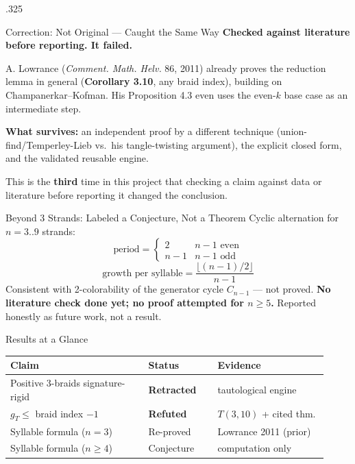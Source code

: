 \documentclass[final]{beamer}
\begin{document}
\begin{frame}[t]
\begin{columns}[t, totalwidth=\textwidth]
\begin{column}{.325\linewidth}
\begin{block}{Correction: Not Original --- Caught the Same Way}
\centering
{\color{sealcolor}\Large\textbf{Checked against literature before reporting. It failed.}}

\vspace{8pt}
\raggedright
A. Lowrance (\emph{Comment. Math. Helv.} 86, 2011) already proves the
reduction lemma in general (\textbf{Corollary 3.10}, any braid index),
building on Champanerkar--Kofman. His Proposition 4.3 even uses the
even-$k$ base case as an intermediate step.

\vspace{6pt}
\textbf{What survives:} an independent proof by a different technique
(union-find/Temperley-Lieb vs.\ his tangle-twisting argument), the
explicit closed form, and the validated reusable engine.

\vspace{6pt}
This is the \textbf{third} time in this project that checking a claim
against data or literature before reporting it changed the conclusion.
\end{block}

\begin{block}{Beyond 3 Strands: Labeled a Conjecture, Not a Theorem}
Cyclic alternation for $n=3..9$ strands:
\[
\text{period} = \begin{cases}2 & n{-}1 \text{ even}\\ n{-}1 & n{-}1\text{ odd}\end{cases}
\]
\[
\text{growth per syllable} = \frac{\lfloor (n-1)/2\rfloor}{n-1}
\]
Consistent with 2-colorability of the generator cycle $C_{n-1}$ --- not
proved. \textbf{No literature check done yet; no proof attempted for
$n\ge5$.} Reported honestly as future work, not a result.
\end{block}

\begin{block}{Results at a Glance}
\begin{center}
\small
\begin{tabular}{@{}p{0.40\linewidth}p{0.20\linewidth}p{0.32\linewidth}@{}}
\toprule
\textbf{Claim} & \textbf{Status} & \textbf{Evidence} \\
\midrule
Positive 3-braids signature-rigid & \textbf{Retracted} & tautological engine \\[4pt]
$g_T\le$ braid index $- 1$ & \textbf{Refuted} & $T(3,10)$ + cited thm. \\[4pt]
Syllable formula ($n{=}3$) & Re-proved & Lowrance 2011 (prior) \\[4pt]
Syllable formula ($n{\ge}4$) & Conjecture & computation only \\
\bottomrule
\end{tabular}
\end{center}
\end{block}


\end{column}
\end{columns}
\end{frame}
\end{document}
